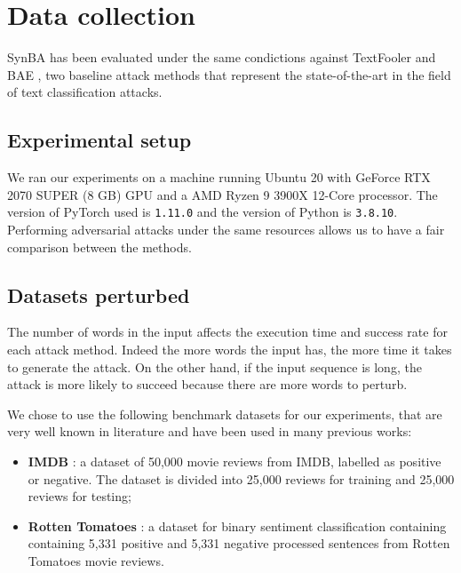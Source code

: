 \section{Data collection}\label{sec:data-collection}

SynBA has been evaluated under the same condictions against TextFooler \cite{conf/emnlp/LiMGXQ20} and BAE \cite{conf/emnlp/GargR20}, two baseline attack methods that represent  the state-of-the-art in the field of text classification attacks. 
\subsection{Experimental setup}\label{subsec:experimental-setup}

We ran our experiments on a machine running
Ubuntu 20 with GeForce RTX 2070 SUPER (8 GB) GPU and a AMD Ryzen 9 3900X 12-Core processor.
The version of PyTorch used is \texttt{1.11.0} and the version of Python is \texttt{3.8.10}.
Performing adversarial attacks under the same resources allows us to have a fair comparison between the methods.


\subsection{Datasets perturbed}\label{subsec:datasets-perturbed}

The number of words in the input affects the execution time and success rate for each attack method. 
Indeed the more words the input has, the more time it takes to generate the attack.
On the other hand, if the input sequence is long, the attack is more likely to succeed because there are more words to perturb.

We chose to use the following benchmark datasets for our experiments, that are very well known in literature and have been used in many previous works:
\begin{itemize}
    \item \textbf{IMDB} \cite{maas-EtAl:2011:ACL-HLT2011}: a dataset of 50,000 movie reviews from IMDB, labelled as positive or negative. The dataset is divided into 25,000 reviews for training and 25,000 reviews for testing;
    \item \textbf{Rotten Tomatoes} \cite{pang-lee:2005a}: a dataset for binary sentiment classification  containing containing 5,331 positive and 5,331 negative processed sentences from Rotten Tomatoes movie reviews.
\end{itemize}

